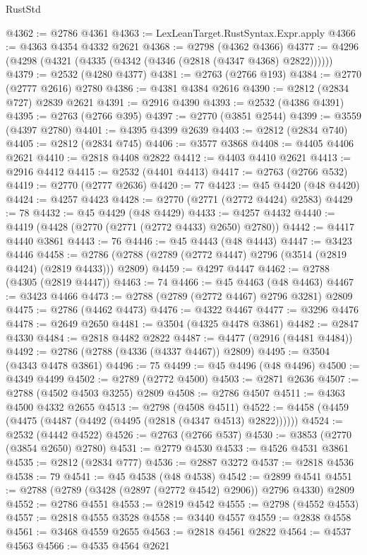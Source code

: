 \begin{lexlean}{RustStd}
\begin{coremodule}
@4362 := @2786 @4361
@4363 := LexLeanTarget.RustSyntax.Expr.apply
@4366 := @4363 @4354 @4332 @2621
@4368 := @2798 (@4362 @4366)
@4377 := @4296 (@4298 (@4321 (@4335 (@4342 (@4346 (@2818 (@4347 @4368) @2822))))))
@4379 := @2532 (@4280 @4377)
@4381 := @2763 (@2766 @193)
@4384 := @2770 (@2777 @2616) @2780
@4386 := @4381 @4384 @2616
@4390 := @2812 (@2834 @727) @2839 @2621
@4391 := @2916 @4390
@4393 := @2532 (@4386 @4391)
@4395 := @2763 (@2766 @395)
@4397 := @2770 (@3851 @2544)
@4399 := @3559 (@4397 @2780)
@4401 := @4395 @4399 @2639
@4403 := @2812 (@2834 @740)
@4405 := @2812 (@2834 @745)
@4406 := @3577 @3868
@4408 := @4405 @4406 @2621
@4410 := @2818 @4408 @2822
@4412 := @4403 @4410 @2621
@4413 := @2916 @4412
@4415 := @2532 (@4401 @4413)
@4417 := @2763 (@2766 @532)
@4419 := @2770 (@2777 @2636)
@4420 := 77
@4423 := @45 @4420 (@48 @4420)
@4424 := @4257 @4423
@4428 := @2770 (@2771 (@2772 @4424) @2583)
@4429 := 78
@4432 := @45 @4429 (@48 @4429)
@4433 := @4257 @4432
@4440 := @4419 (@4428 (@2770 (@2771 (@2772 @4433) @2650) @2780))
@4442 := @4417 @4440 @3861
@4443 := 76
@4446 := @45 @4443 (@48 @4443)
@4447 := @3423 @4446
@4458 := @2786 (@2788 (@2789 (@2772 @4447) @2796 (@3514 (@2819 @4424) (@2819 @4433))) @2809)
@4459 := @4297 @4447
@4462 := @2788 (@4305 (@2819 @4447))
@4463 := 74
@4466 := @45 @4463 (@48 @4463)
@4467 := @3423 @4466
@4473 := @2788 (@2789 (@2772 @4467) @2796 @3281) @2809
@4475 := @2786 (@4462 @4473)
@4476 := @4322 @4467
@4477 := @3296 @4476
@4478 := @2649 @2650
@4481 := @3504 (@4325 @4478 @3861)
@4482 := @2847 @4330
@4484 := @2818 @4482 @2822
@4487 := @4477 (@2916 (@4481 @4484))
@4492 := @2786 (@2788 (@4336 (@4337 @4467)) @2809)
@4495 := @3504 (@4343 @4478 @3861)
@4496 := 75
@4499 := @45 @4496 (@48 @4496)
@4500 := @4349 @4499
@4502 := @2789 (@2772 @4500)
@4503 := @2871 @2636
@4507 := @2788 (@4502 @4503 @3255) @2809
@4508 := @2786 @4507
@4511 := @4363 @4500 @4332 @2655
@4513 := @2798 (@4508 @4511)
@4522 := @4458 (@4459 (@4475 (@4487 (@4492 (@4495 (@2818 (@4347 @4513) @2822))))))
@4524 := @2532 (@4442 @4522)
@4526 := @2763 (@2766 @537)
@4530 := @3853 (@2770 (@3854 @2650) @2780)
@4531 := @2779 @4530
@4533 := @4526 @4531 @3861
@4535 := @2812 (@2834 @777)
@4536 := @2887 @3272
@4537 := @2818 @4536
@4538 := 79
@4541 := @45 @4538 (@48 @4538)
@4542 := @2899 @4541
@4551 := @2788 (@2789 (@3428 (@2897 (@2772 @4542) @2906)) @2796 @4330) @2809
@4552 := @2786 @4551
@4553 := @2819 @4542
@4555 := @2798 (@4552 @4553)
@4557 := @2818 @4555 @3528
@4558 := @3440 @4557
@4559 := @2838 @4558
@4561 := @3468 @4559 @2655
@4563 := @2818 @4561 @2822
@4564 := @4537 @4563
@4566 := @4535 @4564 @2621

\end{coremodule}
\end{lexlean}
